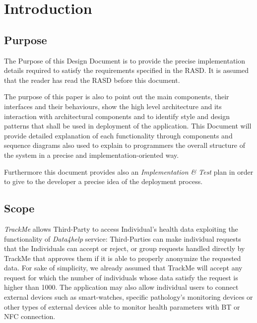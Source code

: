 \documentclass[a4paper]{article}
\begin{document}

\tableofcontents
{}

\newpage
\pagestyle{fancy}

\section{Introduction}
\subsection{Purpose}
    The Purpose of this Design Document is to provide the precise implementation details required to satisfy the requirements specified in the RASD.
    It is assumed that the reader has read the RASD before this document.
    
    The purpose of this paper is also to point out the main components, their interfaces and their behaviours, show the high level architecture and its interaction with architectural components and to identify style and design patterns that shall be used in deployment of the application. This Document will provide detailed explanation of each functionality through components and sequence diagrams also used to explain to programmers the overall structure of the system in a precise and implementation-oriented way.
    
    Furthermore this document provides also an \textit{Implementation \& Test} plan in order to give to the developer a precise idea of the deployment process.
 
\subsection{Scope}
    \textit{TrackMe} allows Third-Party to access Individual's health data exploiting the functionality of \textit{Data4help} service: Third-Parties can make individual requests that the Individuals can accept or reject, or group requests handled directly by TrackMe that approves them if it is able to properly anonymize the requested data. For sake of simplicity, we already assumed that TrackMe will accept any request for which the number of individuals whose data satisfy the request is higher than 1000. The application may also allow individual users to connect external devices such as smart-watches, specific pathology's monitoring devices or other types of external devices able to monitor health parameters with BT or NFC connection.
\end{document}
